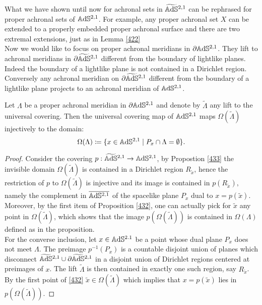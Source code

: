 What we have shown until now for achronal sets in $\widetilde{\mathbb{A}\mathrm{d}\mathbb{S}}{}^{2,1}$ can be rephrased for proper achronal sets of $\mathbb{A}\mathrm{d}\mathbb{S}^{2,1}$. For example, any proper achronal set $X$ can be extended to a properly embedded proper achronal surface and there are two extremal extensions, just as in Lemma \ref{422}\\
Now we would like to focus on proper achronal meridians in $\partial\mathbb{A}\mathrm{d}\mathbb{S}^{2,1}$. They lift to achronal meridians in $\partial\widetilde{\mathbb{A}\mathrm{d}\mathbb{S}}{}^{2,1}$ different from the boundary of lightlike planes. Indeed the boundary of a lightlike plane is not contained in a Dirichlet region. Conversely any achronal meridian on $\partial\widetilde{\mathbb{A}\mathrm{d}\mathbb{S}}{}^{2,1}$ different from the boundary of a lightlike plane projects to an achronal meridian of $\mathbb{A}\mathrm{d}\mathbb{S}^{2,1}$.

\begin{proposition}\label{453}
    Let $\Lambda$ be a proper achronal meridian in $\partial\mathbb{A}\mathrm{d}\mathbb{S}^{2,1}$ and denote by $\widetilde{\Lambda}$ any lift to the universal covering. Then the universal covering map of $\mathbb{A}\mathrm{d}\mathbb{S}^{2,1}$ maps $\Omega(\widetilde{\Lambda})$ injectively to the domain: 
    \[
        \Omega(\Lambda)\coloneqq \{x\in\mathbb{A}\mathrm{d}\mathbb{S}^{2,1}\;|\;P_x\cap\Lambda=\emptyset\}.
    \]
\end{proposition}
    
\begin{proof}
Consider the covering $p:\widetilde{\mathbb{A}\mathrm{d}\mathbb{S}}{}^{2,1}\to \mathbb{A}\mathrm{d}\mathbb{S}^{2,1}$, by Propostion \ref{433} the invisible domain $\Omega(\widetilde{\Lambda})$ is contained in a Dirichlet region $R_{\widetilde{x}}$, hence the restriction of $p$ to $\Omega(\widetilde{\Lambda})$ is injective and its image is contained in $p(R_{\widetilde{x}}),$ namely the complement in $\overline{\mathbb{A}\mathrm{d}\mathbb{S}^{2,1}}$ of the spacelike plane $P_x$ dual to $x=p(\widetilde{x})$. Moreover, by the first item of Proposition \ref{432}, one can actually pick for $\widetilde{x}$ any point in $\Omega(\widetilde{\Lambda})$, which shows that the image $p(\Omega(\widetilde{\Lambda}))$ is contained in $\Omega(\Lambda)$ defined as in the proposition. \\ 
For the converse inclusion, let $x\in\mathbb{A}\mathrm{d}\mathbb{S}^{2.1}$ be a point whose dual plane $P_x$ does not meet $\Lambda$. The preimage $p^{-1}(P_x)$ is a countable disjoint union of planes which disconnect $\widetilde{\mathbb{A}\mathrm{d}\mathbb{S}}{}^{2,1}\cup \partial\widetilde{\mathbb{A}\mathrm{d}\mathbb{S}}{}^{2,1}$ in a disjoint union of Dirichlet regions centered at preimages of $x$. The lift $\widetilde{\Lambda}$ is then contained in exactly one such region, say $R_{\widetilde{x}}$. By the first point of \ref{432} $\widetilde{x}\in\Omega(\widetilde{\Lambda})$ which implies that   $x=p(\widetilde{x})$ lies in $p(\Omega(\widetilde{\Lambda}))$. 
\end{proof}


